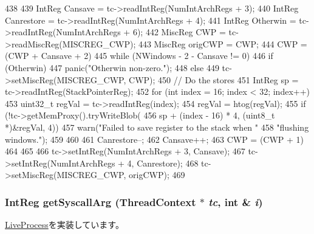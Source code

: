 \begin{DoxyCode}
438 {
439     IntReg Cansave = tc->readIntReg(NumIntArchRegs + 3);
440     IntReg Canrestore = tc->readIntReg(NumIntArchRegs + 4);
441     IntReg Otherwin = tc->readIntReg(NumIntArchRegs + 6);
442     MiscReg CWP = tc->readMiscReg(MISCREG_CWP);
443     MiscReg origCWP = CWP;
444     CWP = (CWP + Cansave + 2) %
445     while (NWindows - 2 - Cansave != 0) {
446         if (Otherwin) {
447             panic("Otherwin non-zero.\n");
448         } else {
449             tc->setMiscReg(MISCREG_CWP, CWP);
450             // Do the stores
451             IntReg sp = tc->readIntReg(StackPointerReg);
452             for (int index = 16; index < 32; index++) {
453                 uint32_t regVal = tc->readIntReg(index);
454                 regVal = htog(regVal);
455                 if (!tc->getMemProxy().tryWriteBlob(
456                         sp + (index - 16) * 4, (uint8_t *)&regVal, 4)) {
457                     warn("Failed to save register to the stack when "
458                             "flushing windows.\n");
459                 }
460             }
461             Canrestore--;
462             Cansave++;
463             CWP = (CWP + 1) %
464         }
465     }
466     tc->setIntReg(NumIntArchRegs + 3, Cansave);
467     tc->setIntReg(NumIntArchRegs + 4, Canrestore);
468     tc->setMiscReg(MISCREG_CWP, origCWP);
469 }
\end{DoxyCode}
\hypertarget{classSparc32LiveProcess_abab14482db5480cf54186cb10b08491e}{
\subsubsection[{getSyscallArg}]{\setlength{\rightskip}{0pt plus 5cm}IntReg getSyscallArg ({\bf ThreadContext} $\ast$ {\em tc}, \/  int \& {\em i})}}
\label{classSparc32LiveProcess_abab14482db5480cf54186cb10b08491e}


\hyperlink{classLiveProcess_aa001ff57ec460026facb89ba19c7bf96}{LiveProcess}を実装しています。


